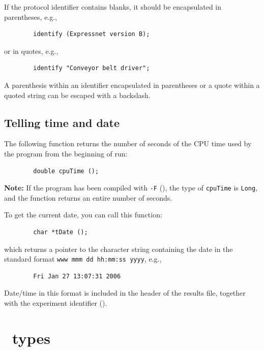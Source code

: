 If the protocol identifier contains blanks, it should be encapsulated in
parentheses, e.g.,
\begin{verbatim}
        identify (Expressnet version B);
\end{verbatim}
or in quotes, e.g.,
\begin{verbatim}
        identify "Conveyor belt driver";
\end{verbatim}

A parenthesis within an identifier encapsulated in parentheses
or a quote within a
quoted string can be escaped with a backslash.

\subsection{Telling time and date}
\label{rm_au_td}

The following function returns the number of seconds of the CPU time used
by the program from the beginning of run:
\begin{verbatim}
        double cpuTime ();
\end{verbatim}

\medskip

\noindent
{\bf Note:}
If the program has been compiled with {\tt -F} (),
the type of {\tt cpuTime} is {\tt Long}, and the function returns
an entire number of seconds.

\medskip


To get the current date, you can call this function:
\begin{verbatim}
        char *tDate ();
\end{verbatim}
which returns a pointer to the character string containing the date in the
standard format {\tt www\ mmm\ dd\ hh:mm:ss\ yyyy}, e.g.,
\begin{verbatim}
        Fri Jan 27 13:07:31 2006
\end{verbatim}

Date/time in this format is included in the header of the results
file, together with the experiment identifier ().

\section{\smurph\ types}
\label{rm_st}

